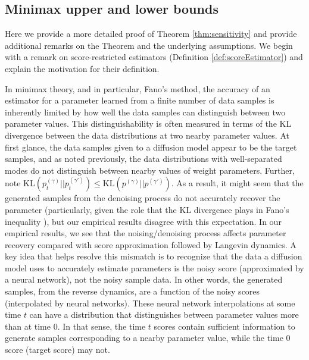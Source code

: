 \documentclass[11pt]{article}
\theoremstyle{plain}
\newcommand{\1}{\mathbbm{1}}
\newcommand{\pdist}[2][]{p_{#1}^{(#2)}}
\begin{document}
\begin{appendices}

\section{Minimax upper and lower bounds}
\label{sec:lowerUpperBounds}
Here we provide a more detailed proof of Theorem \ref{thm:sensitivity} and provide additional remarks on the Theorem and the underlying assumptions. We begin with a remark on score-restricted estimators (Definition \ref{def:scoreEstimator}) and explain the motivation for their definition.

In minimax theory, and in particular, Fano's method, the accuracy of an estimator for a parameter learned from a finite number of data samples is inherently limited by how well the data samples can distinguish between two parameter values. This distinguishability is often measured in terms of the KL divergence between the data distributions at two nearby parameter values. At first glance, the data samples given to a diffusion model appear to be the target samples, and as noted previously, the data distributions with well-separated modes do not distinguish between nearby values of weight parameters. Further, note
$\mathrm{KL}(\pdist[t]{\gamma}||\pdist[t]{\gamma'}) \leq
\mathrm{KL}(\pdist{\gamma}||\pdist{\gamma'}).$ As a result, it might seem that the generated samples from the denoising process do not accurately recover the parameter (particularly, given the role that the KL divergence plays in Fano's inequality \citep{binyu}), but our empirical results disagree with this expectation. 
In our empirical results, we see that the noising/denoising process affects parameter recovery compared with score approximation followed by Langevin dynamics. A key idea that helps resolve this mismatch is to recognize that the data a diffusion model uses to accurately estimate parameters is the noisy score (approximated by a neural network), not the noisy sample data. In other words, the generated samples, from the reverse dynamics, are a function of the noisy scores (interpolated by neural networks). These neural network interpolations at some time $t$ can have a distribution that distinguishes between parameter values more than at time $0$. In that sense, the time $t$ scores contain sufficient information to generate samples corresponding to a nearby parameter value, while the time $0$ score (target score) may not. 


\end{appendices}
\end{document}
